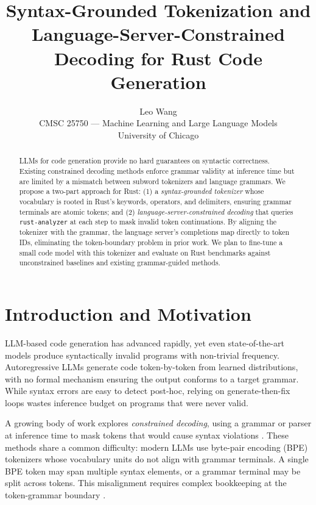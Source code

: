 \documentclass[11pt,letterpaper]{article}
\title{\textbf{Syntax-Grounded Tokenization and Language-Server-Constrained Decoding for Rust Code Generation}}
\author{
  Leo Wang \\
  CMSC 25750 --- Machine Learning and Large Language Models \\
  University of Chicago
}
\date{}
\begin{document}
\maketitle

\begin{abstract}
LLMs for code generation provide no hard guarantees on syntactic correctness. Existing constrained decoding methods enforce grammar validity at inference time but are limited by a mismatch between subword tokenizers and language grammars. We propose a two-part approach for Rust: (1) a \emph{syntax-grounded tokenizer} whose vocabulary is rooted in Rust's keywords, operators, and delimiters, ensuring grammar terminals are atomic tokens; and (2) \emph{language-server-constrained decoding} that queries \texttt{rust-analyzer} at each step to mask invalid token continuations. By aligning the tokenizer with the grammar, the language server's completions map directly to token IDs, eliminating the token-boundary problem in prior work. We plan to fine-tune a small code model with this tokenizer and evaluate on Rust benchmarks against unconstrained baselines and existing grammar-guided methods.
\end{abstract}

\section{Introduction and Motivation}

LLM-based code generation has advanced rapidly, yet even state-of-the-art models produce syntactically invalid programs with non-trivial frequency. Autoregressive LLMs generate code token-by-token from learned distributions, with no formal mechanism ensuring the output conforms to a target grammar. While syntax errors are easy to detect post-hoc, relying on generate-then-fix loops wastes inference budget on programs that were never valid.

A growing body of work explores \emph{constrained decoding}, using a grammar or parser at inference time to mask tokens that would cause syntax violations \citep{willard2023outlines, scholak2021picard, poesia2022synchromesh, ugare2024syncode}. These methods share a common difficulty: modern LLMs use byte-pair encoding (BPE) tokenizers whose vocabulary units do not align with grammar terminals. A single BPE token may span multiple syntax elements, or a grammar terminal may be split across tokens. This misalignment requires complex bookkeeping at the token-grammar boundary \citep{ugare2024syncode}.
\end{document}
